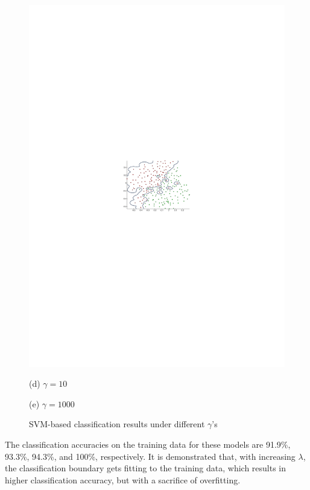 \documentclass[10pt,a4paper]{article}
\begin{document}
\begin{figure}[htb!]
\begin{center}
       \parbox{.45\columnwidth}{\center\includegraphics[width=.44\columnwidth]{gamma1000}}
       \parbox{.45\columnwidth}{\center\scriptsize(d) $\gamma=10$}
       \parbox{.45\columnwidth}{\center\scriptsize(e) $\gamma=1000$}
       \caption{SVM-based classification results under different $\gamma$'s}
       \label{fig:varvol}
       \end{center}
    \end{figure}
%
The classification accuracies on the training data for these models are 91.9\%, 93.3\%, 94.3\%, and 100\%, respectively. It is demonstrated that, with increasing $\lambda$, the classification boundary gets fitting to the training data, which results in higher classification accuracy, but with a sacrifice of overfitting.
\end{document}
